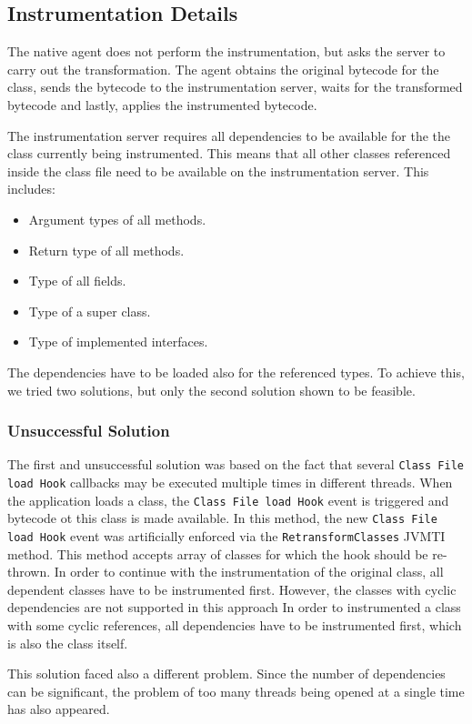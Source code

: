 \subsection{Instrumentation Details}
\label{imp:native:inst}
The native agent does not perform the instrumentation, but asks the server to carry out the transformation. The agent obtains the original bytecode for the class, sends the bytecode to the instrumentation server, waits for the transformed bytecode and lastly, applies the instrumented bytecode.

The instrumentation server requires all dependencies to be available for the the class currently being instrumented. This means that all other classes referenced inside the class file need to be available on the instrumentation server. This includes:
\begin{itemize}
	\item Argument types of all methods.
	\item Return type of all methods.
	\item Type of all fields.
	\item Type of a super class.
	\item Type of implemented interfaces.
\end{itemize}
The dependencies have to be loaded also for the referenced types. To achieve this, we tried two solutions, but only the second solution shown to be feasible.

\subsubsection{Unsuccessful Solution}
The first and unsuccessful solution was based on the fact that several \texttt{Class File load Hook} callbacks may be executed multiple times in different threads. When the application loads a class, the \texttt{Class File load Hook} event is triggered and bytecode ot this class is made available. In this method, the new \texttt{Class File load Hook} event was artificially enforced via the \texttt{RetransformClasses} JVMTI method. This method accepts array of classes for which the hook should be re-thrown. In order to continue with the instrumentation of the original class, all dependent classes have to be instrumented first. However, the classes with cyclic dependencies are not supported in this approach In order to instrumented a class with some cyclic references, all dependencies have to be instrumented first, which is also the class itself.

This solution faced also a different problem. Since the number of dependencies can be significant, the problem of too many threads being opened at a single time has also appeared. 

